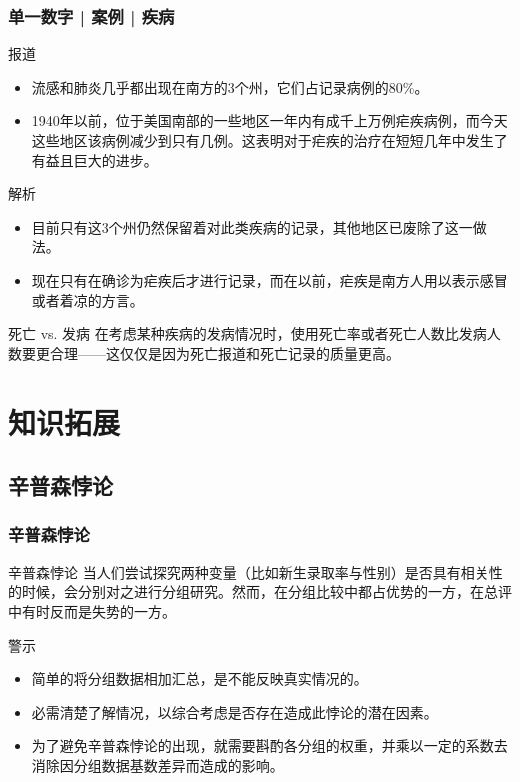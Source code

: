 \begin{frame}
  \frametitle{单一数字 | 案例 | 疾病}
  \begin{block}{报道}
    \begin{itemize}
      \item 流感和肺炎几乎都出现在南方的3个州，它们占记录病例的80\%。
      \item 1940年以前，位于美国南部的一些地区一年内有成千上万例疟疾病例，而今天这些地区该病例减少到只有几例。这表明对于疟疾的治疗在短短几年中发生了有益且巨大的进步。
    \end{itemize}
  \end{block}
  \vspace{-0.4em}
  \pause \pause \pause \pause
  \begin{block}{解析}
    \begin{itemize}
      \item 目前只有这3个州仍然保留着对此类疾病的记录，其他地区已废除了这一做法。
      \item 现在只有在确诊为疟疾后才进行记录，而在以前，疟疾是南方人用以表示感冒或者着凉的方言。
    \end{itemize}
  \end{block}
  \vspace{-0.4em}
  \pause
  \begin{block}{死亡 vs. 发病}
    在考虑某种疾病的发病情况时，使用死亡率或者死亡人数比发病人数要更合理——这仅仅是因为死亡报道和死亡记录的质量更高。
  \end{block}
\end{frame}

\section{知识拓展}
\subsection{辛普森悖论}
\begin{frame}
  \frametitle{辛普森悖论}
  \begin{block}{辛普森悖论}
当人们尝试探究两种变量（比如新生录取率与性别）是否具有相关性的时候，会分别对之进行分组研究。然而，在分组比较中都占优势的一方，在总评中有时反而是失势的一方。
  \end{block}
  \pause
  \begin{block}{警示}
    \begin{itemize}
      \item 简单的将分组数据相加汇总，是不能反映真实情况的。
      \item 必需清楚了解情况，以综合考虑是否存在造成此悖论的潜在因素。
      \item 为了避免辛普森悖论的出现，就需要斟酌各分组的权重，并乘以一定的系数去消除因分组数据基数差异而造成的影响。
    \end{itemize}
  \end{block}
\end{frame}

